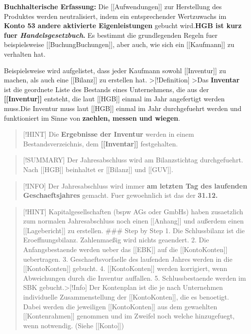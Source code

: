 \textbf{Buchhalterische Erfassung:} Die {[}{[}Aufwendungen{]}{]} zur
Herstellung des Produktes werden neutralisiert, indem ein entsprechender
Wertzuwachs im \textbf{Konto 53 andere aktivierte Eigenleistungen}
gebucht wird.\textbf{HGB ist kurz fuer \emph{Handelsgesetzbuch}.} Es
bestimmt die grundlegenden Regeln fuer beispielsweise
{[}{[}Buchung\textbar Buchungen{]}{]}, aber auch, wie sich ein
{[}{[}Kaufmann{]}{]} zu verhalten hat.

Beispielsweise wird aufgelistet, dass jeder Kaufmann sowohl
{[}{[}Inventur{]}{]} zu machen, als auch eine {[}{[}Bilanz{]}{]} zu
erstellen hat. \textgreater{[}!Definition{]} \textgreater Das
\textbf{Inventar} ist die geordnete Liste des Bestands eines
Unternehmens, die aus der \textbf{{[}{[}Inventur{]}{]}} entsteht, die
laut {[}{[}HGB{]}{]} einmal im Jahr angefertigt werden muss.Die Inventur
muss laut {[}{[}HGB{]}{]} einmal im Jahr durchgefuehrt werden und
funktioniert im Sinne von \textbf{zaehlen, messen und wiegen}.

\begin{quote}
{[}!HINT{]} Die \textbf{Ergebnisse der Inventur} werden in einem
Bestandsverzeichnis, dem \textbf{{[}{[}Inventar{]}{]}} festgehalten.
\end{quote}

\begin{quote}
{[}!SUMMARY{]} Der Jahresabschluss wird am Bilanzstichtag durchgefuehrt.
Nach {[}{[}HGB{]}{]} beinhaltet er {[}{[}Bilanz{]}{]} und
{[}{[}GUV{]}{]}.
\end{quote}

\begin{quote}
{[}!INFO{]} Der Jahresabschluss wird immer \textbf{am letzten Tag des
laufenden Geschaeftsjahres} gemacht. Fuer gewoehnlich ist das der
\textbf{31.12.}
\end{quote}

\begin{quote}
{[}!HINT{]} Kapitalgesellschaften (bspw AGs oder GmbHs) haben zusaetzlich
zum normalen Jahresabschluss noch einen {[}{[}Anhang{]}{]} und außerdem
einen {[}{[}Lagebericht{]}{]} zu erstellen. \#\#\# Step by Step 1. Die
Schlussbilanz ist die Eroeffnungsbilanz. Zahlenmaeßig wird nichts
geaendert. 2. Die Anfangsbestaende werden ueber das {[}{[}EBK{]}{]} auf die
{[}{[}Konto\textbar Konten{]}{]} uebertragen. 3. Geschaeftsvorfaelle des
laufenden Jahres werden in die {[}{[}Konto\textbar Konten{]}{]} gebucht.
4. {[}{[}Konto\textbar Konten{]}{]} werden korrigiert, wenn Abweichungen
durch die Inventur auffallen. 5. Schlussbestaende werden im SBK
gebucht.\textgreater{[}!Info{]} Der Kontenplan ist die je nach
Unternehmen individuelle Zusammenstellung der
{[}{[}Konto\textbar Konten{]}{]}, die es benoetigt. Dabei werden die
jeweiligen {[}{[}Konto\textbar Konten{]}{]} aus dem gewaehlten
{[}{[}Kontenrahmen{]}{]} genommen und im Zweifel noch welche
hinzugefuegt, wenn notwendig. (Siehe {[}{[}Konto{]}{]})
\end{quote}


